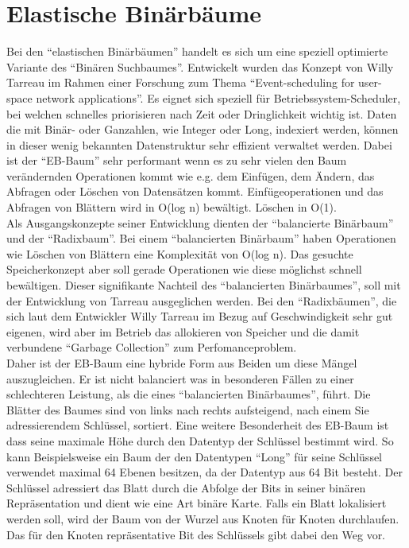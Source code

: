 \documentclass[a4paper,11pt,oneside,%
headsepline,												%
footsepline,												%
bibtotocnumbered									%
]{scrreprt}
\begin{document}
\section{Elastische Binärbäume}
\label{sec:ebTreeGrundlagen}
Bei den \enquote{elastischen Binärbäumen} handelt es sich um eine speziell optimierte Variante des \enquote{Binären Suchbaumes}. %
 Entwickelt wurden das Konzept von Willy Tarreau\autocite{Tarreau} im Rahmen einer Forschung zum Thema \enquote{Event-scheduling for user-space network applications}. Es eignet sich speziell für Betriebssystem-Scheduler, bei welchen schnelles priorisieren nach Zeit oder Dringlichkeit wichtig ist. Daten die mit Binär- oder Ganzahlen, wie Integer oder Long, indexiert werden, können in dieser wenig bekannten Datenstruktur sehr effizient verwaltet werden. Dabei ist der \enquote{\ac{EB-Baum}} sehr performant wenn es zu sehr vielen den Baum verändernden Operationen kommt wie e.g. dem Einfügen, dem Ändern, das Abfragen oder Löschen  von Datensätzen kommt\autocite{Tarreau}.
Einfügeoperationen und das Abfragen von Blättern wird in O(log n) bewältigt. Löschen in O(1).\\

Als Ausgangskonzepte seiner Entwicklung dienten der \enquote{balancierte Binärbaum} und der \enquote{Radixbaum}. Bei einem \enquote{balancierten Binärbaum} haben  Operationen wie Löschen von Blättern  eine Komplexität von O(log n). Das gesuchte Speicherkonzept aber soll gerade Operationen wie diese möglichst schnell bewältigen. Dieser signifikante Nachteil des \enquote{balancierten Binärbaumes}, soll mit der Entwicklung von Tarreau ausgeglichen werden. Bei den \enquote{Radixbäumen}, die sich laut dem Entwickler Willy Tarreau\autocite[Absatz Introduction]{Tarreau} im Bezug auf Geschwindigkeit sehr gut eigenen, wird aber im Betrieb das allokieren von Speicher und die damit verbundene \enquote{Garbage Collection} zum Perfomanceproblem.\\

Daher ist der \ac{EB-Baum} eine hybride Form aus Beiden um diese Mängel auszugleichen. Er ist nicht balanciert was in besonderen Fällen zu einer schlechteren Leistung, als die eines \enquote{balancierten Binärbaumes}, führt. Die Blätter des Baumes sind von links nach rechts aufsteigend, nach einem Sie adressierendem Schlüssel, sortiert.
Eine weitere Besonderheit des \ac{EB-Baum} ist dass seine maximale Höhe durch den Datentyp der Schlüssel bestimmt wird. So kann Beispielsweise ein Baum der den Datentypen \enquote{Long} für seine Schlüssel verwendet maximal 64 Ebenen besitzen, da der Datentyp aus 64 Bit besteht. Der Schlüssel adressiert das Blatt durch die Abfolge der Bits in seiner binären Repräsentation und dient wie eine Art binäre Karte. Falls ein Blatt lokalisiert werden soll, wird der Baum von der Wurzel aus Knoten für Knoten durchlaufen. Das für den Knoten repräsentative Bit des Schlüssels gibt dabei den Weg vor.
\end{document}
